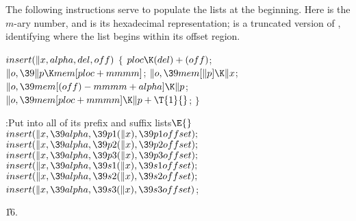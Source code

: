 The following instructions serve to populate the
lists at the beginning.
Here  is the $m$-ary number, and  is its hexadecimal
representation;
 is a truncated version of , identifying where the
list
begins within its offset region.

\Y\B\4\D$\\{insert}(\|x,\\{alpha},\\{del},\\{off})$ \6
${}\{{}$\1\6
${}\\{ploc}\K(\\{del})+(\\{off}){}$;\6
${}\|o,\39\|p\K\\{mem}[\\{ploc}+\\{mmmm}]{}$;\6
${}\|o,\39\\{mem}[\|p]\K\|x{}$;\6
${}\|o,\39\\{mem}[(\\{off})-\\{mmmm}+\\{alpha}]\K\|p{}$;\6
${}\|o,\39\\{mem}[\\{ploc}+\\{mmmm}]\K\|p+\T{1}{}$;\6
\4${}\}{}$\2\par
\Y\B\4:Put  into all of its prefix and suffix lists\X${}\E{}$%
\6
$\\{insert}(\|x,\39\\{alpha},\39\\{p1}(\|x),\39\\{p1offset});{}$\6
${}\\{insert}(\|x,\39\\{alpha},\39\\{p2}(\|x),\39\\{p2offset});{}$\6
${}\\{insert}(\|x,\39\\{alpha},\39\\{p3}(\|x),\39\\{p3offset});{}$\6
${}\\{insert}(\|x,\39\\{alpha},\39\\{s1}(\|x),\39\\{s1offset});{}$\6
${}\\{insert}(\|x,\39\\{alpha},\39\\{s2}(\|x),\39\\{s2offset});{}$\6
${}\\{insert}(\|x,\39\\{alpha},\39\\{s3}(\|x),\39\\{s3offset}){}$;\par
\U16.\fi

